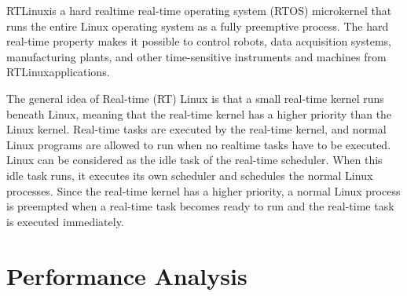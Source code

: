 \documentclass[conference]{IEEEtran}
\newcommand\rtlinux{RTLinux}
\begin{document}
\rtlinux is a hard realtime real-time operating system (RTOS) microkernel that runs the entire Linux operating system as a fully preemptive process. The hard real-time property makes it possible to control robots, data acquisition systems, manufacturing plants, and other time-sensitive instruments and machines from \rtlinux applications.

The general idea of Real-time (RT) Linux is that a small real-time kernel runs beneath Linux, meaning that the real-time kernel has a higher priority than the Linux kernel. Real-time tasks are executed by the real-time kernel, and normal Linux programs are allowed to run when no realtime tasks have to be executed. Linux can be considered as the idle task of the real-time scheduler. When this idle task runs, it executes its own scheduler and schedules the normal Linux processes. Since the real-time kernel has a higher priority, a normal Linux process is preempted when a real-time task becomes ready to run and the real-time task is executed immediately.

\section{Performance Analysis}




%
%

\end{document}
